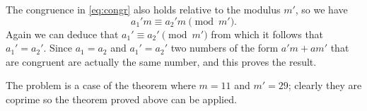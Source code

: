 \documentclass[a4paper]{article}
\begin{document}
\begin{enumerate}
		The congruence in \eqref{eq:congr}
		also holds relative to the modulus
		\(m'\), so we have
		\[a_1'm\equiv a_2'm\pmod{m'}.\]
		Again we can deduce that
		\(a_1'\equiv a_2'\pmod{m'}\) 
		from which it follows that
		\(a_1'=a_2'\).
		Since \(a_1=a_2\) and \(a_1'=a_2'\)
		two numbers of the
		form \(a'm+am'\) that are congruent
		are actually the same number,
		and this proves the result.
		
		The problem is a case of the theorem where \(m=11\)
		and \(m'=29\); clearly they are coprime so the theorem proved
		above can be applied.
\end{enumerate}
\end{document}
